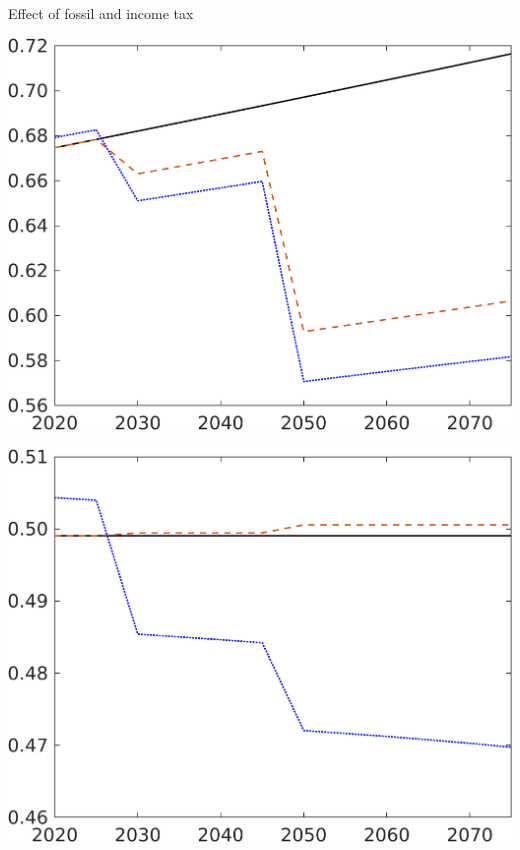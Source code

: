 \documentclass[11pt,aspectratio=169]{beamer}
\begin{document}
\begin{frame}{Effect of fossil and income tax}
	\centering
	\begin{minipage}[]{0.3\textwidth}
		\includegraphics[width=1\textwidth]{../codding_model/own_basedOnFried/optimalPol_elastS_DisuSci/figures/all_1705/CompCounterFac_withLF_taufopt1_taulopt0_C_spillover0_noskill0_sep1_BN0_ineq0_red0_xgrowth0_etaa0.79_lgd0.png}
	\end{minipage}
	\begin{minipage}[]{0.3\textwidth}
		\includegraphics[width=1\textwidth]{../codding_model/own_basedOnFried/optimalPol_elastS_DisuSci/figures/all_1705/CompCounterFac_withLF_taufopt1_taulopt0_hh_spillover0_noskill0_sep1_BN0_ineq0_red0_xgrowth0_etaa0.79_lgd0.png}

\end{minipage}
\end{frame}
\end{document}
